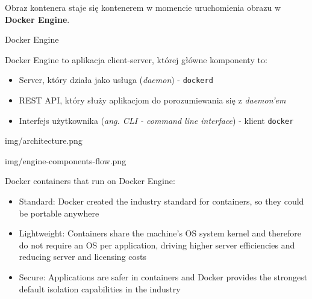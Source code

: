 \documentclass[aspectratio=169]{beamer}
\begin{document}
\begin{frame}
    \begin{multicols}{2}
        \vspace*{47mm}
        \begin{card}
            Obraz kontenera staje się kontenerem w momencie uruchomienia obrazu w \textbf{Docker Engine}.
        \end{card}
    \end{multicols}
\end{frame}

\begin{frame}{Docker Engine}

    \begin{card}
        Docker Engine to aplikacja client-server, której główne komponenty to:
        \begin{itemize}
            \item Server, który działa jako usługa (\textit{daemon}) - \colorbox{dark-gray}{\lstinline{dockerd}}
            \item REST API, który służy aplikacjom do porozumiewania się z \textit{daemon'em}
            \item Interfejs użytkownika (\textit{ang. CLI - command line interface}) - klient \colorbox{dark-gray}{\lstinline{docker}}
        \end{itemize}
    \end{card}
\end{frame}

\begin{frameImg}[50mm]{img/architecture.png}
\end{frameImg}

\begin{frameImg}[\textwidth]{img/engine-components-flow.png}
\end{frameImg}

\begin{frame}
    \begin{card}
        Docker containers that run on Docker Engine:
        \begin{itemize}
            \item Standard: Docker created the industry standard for containers, so they could be portable anywhere
            \item Lightweight: Containers share the machine’s OS system kernel and therefore do not require an OS per application, driving higher server efficiencies and reducing server and licensing costs
            \item Secure: Applications are safer in containers and Docker provides the strongest default isolation capabilities in the industry
        \end{itemize}
    \end{card}
\end{frame}
\end{document}
